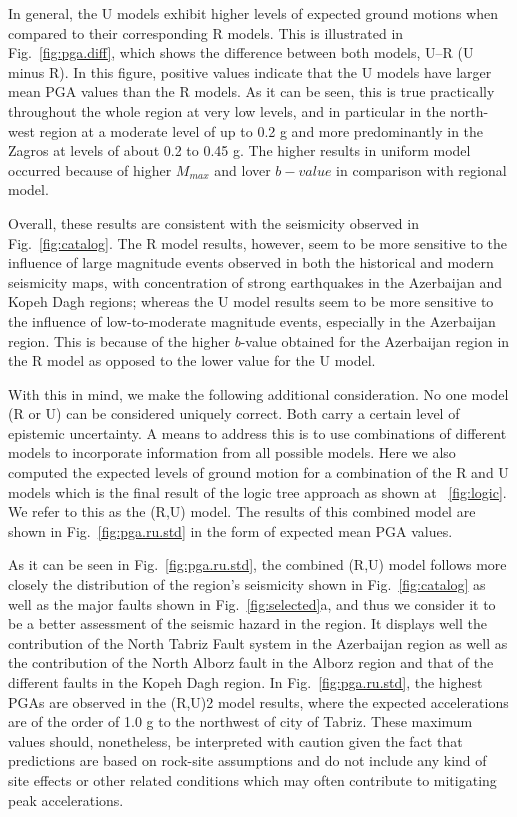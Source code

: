 In general, the U models exhibit higher levels of expected ground motions when compared to their corresponding R models. This is illustrated in Fig.~\ref{fig:pga.diff}, which shows the difference between both models, U--R (U minus R). In this figure, positive values indicate that the U models have larger mean PGA values than the R models. As it can be seen, this is true practically throughout the whole region at very low levels, and in particular in the north-west region at a moderate level of up to 0.2 g and more predominantly in the Zagros at levels of about 0.2 to 0.45 g. The higher results in uniform model occurred because of higher $M_{max}$ and lover $b-value$ in comparison with regional model.

Overall, these results are consistent with the seismicity observed in Fig.~\ref{fig:catalog}. The R model results, however, seem to be more sensitive to the influence of large magnitude events observed in both the historical and modern seismicity maps, with  concentration of strong earthquakes in the Azerbaijan and Kopeh Dagh regions; whereas the U model results seem to be more sensitive to the influence of low-to-moderate magnitude events, especially in the Azerbaijan region. This is because of the higher $b$-value obtained for the Azerbaijan region in the R model as opposed to the lower value for the U model.

With this in mind, we make the following additional consideration. No one model (R or U) can be considered uniquely correct. Both carry a certain level of epistemic uncertainty. A means to address this is to use combinations of different models to incorporate information from all possible models.  Here we also computed the expected levels of ground motion for a combination of the R and U models which is the final result of the logic tree approach as shown at ~\ref{fig:logic}. We refer to this as the (R,U) model. The results of this combined model are shown in Fig.~\ref{fig:pga.ru.std} in the form of expected mean PGA values.

As it can be seen in Fig.~\ref{fig:pga.ru.std}, the combined (R,U) model follows more closely the distribution of the region's seismicity shown in Fig.~\ref{fig:catalog} as well as the major faults shown in Fig.~\ref{fig:selected}a, and thus we consider it to be a better assessment of the seismic hazard in the region. It displays well the contribution of the North Tabriz Fault system in the Azerbaijan region as well as the contribution of the North Alborz fault in the Alborz region and that of the different faults in the Kopeh Dagh region. In Fig.~\ref{fig:pga.ru.std}, the highest PGAs are observed in the (R,U)2 model results, where the expected accelerations are of the order of 1.0 g to the northwest of  city of Tabriz. These maximum values should, nonetheless, be interpreted with caution given the fact that predictions are based on rock-site assumptions and do not include any kind of site effects or other related conditions which may often contribute to mitigating peak accelerations.

